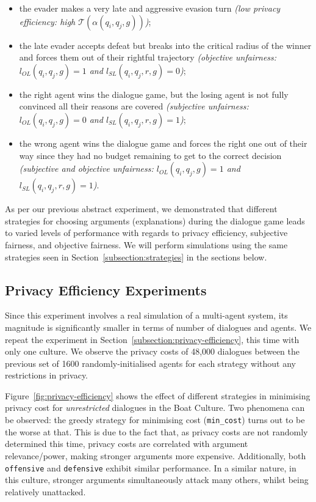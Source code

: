 \documentclass[acmsmall]{custom-arxiv}  %
\begin{document}
\begin{itemize}
    \item the evader makes a very late and aggressive evasion turn \textit{(low privacy efficiency: high $\mathcal{T}(\alpha(q_i, q_j, g))$)};
    \item the late evader accepts defeat but breaks into the critical radius of the winner and forces them out of their rightful trajectory \textit{(objective unfairness: $l_{OL}(q_i,q_j,g) = 1$ and $l_{SL}(q_i, q_j, r, g) = 0$)}; 
    \item the right agent wins the dialogue game, but the losing agent is not fully convinced all their reasons are covered \textit{(subjective unfairness: $l_{OL}(q_i,q_j,g) = 0$ and $l_{SL}(q_i, q_j, r, g) = 1$)};
    \item the wrong agent wins the dialogue game and forces the right one out of their way since they had no budget remaining to get to the correct decision \textit{(subjective and objective unfairness: $l_{OL}(q_i,q_j,g) = 1$ and $l_{SL}(q_i, q_j, r, g) = 1$)}.
\end{itemize}

As per our previous abstract experiment, we demonstrated that different strategies for choosing arguments (explanations) during the dialogue game leads to varied levels of performance with regards to privacy efficiency, subjective fairness, and objective fairness. We will perform simulations using the same strategies seen in Section~\ref{subsection:strategies} in the sections below.

\subsection{Privacy Efficiency Experiments}

Since this experiment involves a real simulation of a multi-agent system, its magnitude is significantly smaller in terms of number of dialogues and agents. We repeat the experiment in Section~\ref{subsection:privacy-efficiency}, this time with only one culture. We observe the privacy costs of 48,000 dialogues between the previous set of 1600 randomly-initialised agents for each strategy without any restrictions in privacy.

Figure~\ref{fig:privacy-efficiency} shows the effect of different strategies in minimising privacy cost for \textit{unrestricted} dialogues in the Boat Culture. Two phenomena can be observed: the greedy strategy for minimising cost (\texttt{min\_cost}) turns out to be the worse at that. This is due to the fact that, as privacy costs are not randomly determined this time, privacy costs are correlated with argument relevance/power, making stronger arguments more expensive. Additionally, both \texttt{offensive} and \texttt{defensive} exhibit similar performance. In a similar nature, in this culture, stronger arguments simultaneously attack many others, whilst being relatively unattacked. 
\end{document}
